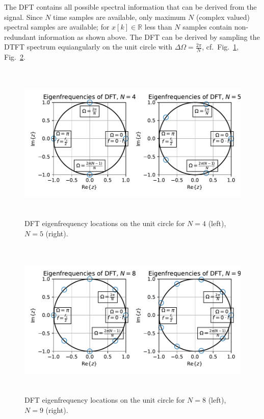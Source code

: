 \documentclass[11pt,a4paper,DIV=12]{scrartcl}
\begin{document}
The DFT contains all possible spectral information that can be derived from the
signal.
%
Since $N$ time samples are available, only maximum $N$ (complex valued) spectral
samples are available; for $x[k]\in\mathbb{R}$ less than $N$ samples contain
non-redundant information as shown above.
%
The DFT can be derived by sampling the DTFT spectrum equiangularly on the unit
circle with $\Delta\Omega=\frac{2\pi}{N}$,
cf.~Fig.~\ref{DFT_Eigenfrequenzen_N4_N5}, Fig.~\ref{DFT_Eigenfrequenzen_N8_N9}.
%
\begin{figure}
		\centering
		\includegraphics[width=6in, height=3in]{graphics/DFT_Eigenfrequencies_N4_N5.pdf}
		\caption{DFT eigenfrequency locations on the unit circle for $N=4$ (left),
		$N=5$ (right).}
		\label{DFT_Eigenfrequenzen_N4_N5}
\end{figure}
\begin{figure}
		\centering
		\includegraphics[width=6in, height=3in]{graphics/DFT_Eigenfrequencies_N8_N9.pdf}
		\caption{DFT eigenfrequency locations on the unit circle for $N=8$ (left),
		$N=9$ (right).}
		\label{DFT_Eigenfrequenzen_N8_N9}
\end{figure}
\end{document}
